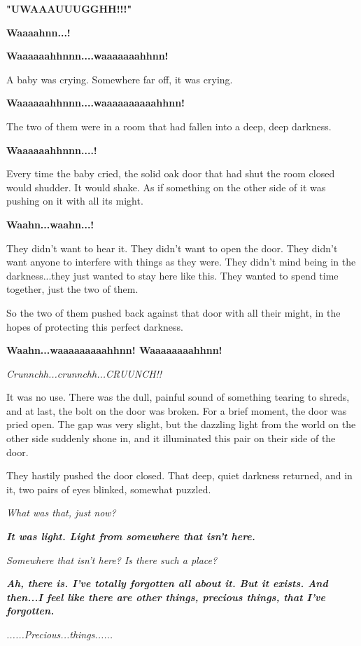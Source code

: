 \documentclass[
]{article}
\begin{document}
\textbf{"UWAAAUUUGGHH!!!"}

\textbf{Waaaahnn...!}

\textbf{Waaaaaahhnnn....waaaaaaahhnn!}

A baby was crying. Somewhere far off, it was crying.

\textbf{Waaaaaahhnnn....waaaaaaaaaahhnn!}

The two of them were in a room that had fallen into a deep, deep
darkness.

\textbf{Waaaaaahhnnn....!}

Every time the baby cried, the solid oak door that had shut the room
closed would shudder. It would shake. As if something on the other side
of it was pushing on it with all its might.

\textbf{Waahn...waahn...!}

They didn't want to hear it. They didn't want to open the door. They
didn't want anyone to interfere with things as they were. They didn't
mind being in the darkness...they just wanted to stay here like this.
They wanted to spend time together, just the two of them.

So the two of them pushed back against that door with all their might,
in the hopes of protecting this perfect darkness.

\textbf{Waahn...waaaaaaaaahhnn! Waaaaaaaahhnn!}

\emph{Crunnchh...crunnchh...CRUUNCH!!}

It was no use. There was the dull, painful sound of something tearing to
shreds, and at last, the bolt on the door was broken. For a brief
moment, the door was pried open. The gap was very slight, but the
dazzling light from the world on the other side suddenly shone in, and
it illuminated this pair on their side of the door.

They hastily pushed the door closed. That deep, quiet darkness returned,
and in it, two pairs of eyes blinked, somewhat puzzled.

\emph{What was that, just now?}

\emph{\textbf{It was light. Light from somewhere that isn't here.}}

\emph{Somewhere that isn't here? Is there such a place?}

\emph{\textbf{Ah, there is. I've totally forgotten all about it. But it
exists. And then...I feel like there are other things, precious things,
that I've forgotten.}}

\emph{......Precious...things......}
\end{document}
